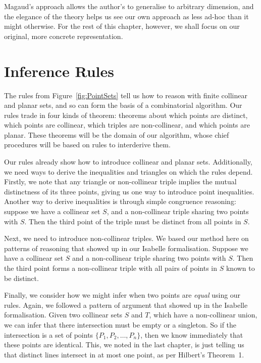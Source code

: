 Magaud's approach allows the author's to generalise to arbitrary dimension, and the elegance of the theory helps us see our own approach as less ad-hoc than it might otherwise. For the rest of this chapter, however, we shall focus on our original, more concrete representation.

\section{Inference Rules}
The rules from Figure~\ref{fig:PointSets} tell us how to reason with finite collinear and planar sets, and so can form the basis of a combinatorial algorithm. Our rules trade in four kinds of theorem: theorems about which points are distinct, which points are collinear, which triples are non-collinear, and which points are planar. These theorems will be the domain of our algorithm, whose chief procedures will be based on rules to interderive them.

Our rules already show how to introduce collinear and planar sets. Additionally, we need ways to derive the inequalities and triangles on which the rules depend. Firstly, we note that any triangle or non-collinear triple implies the mutual distinctness of its three points, giving us one way to introduce point inequalities. Another way to derive inequalities is through simple congruence reasoning: suppose we have a collinear set $S$, and a non-collinear triple sharing two points with $S$. Then the third point of the triple must be distinct from all points in $S$. 

Next, we need to introduce non-collinear triples. We based our method here on patterns of reasoning that showed up in our Isabelle formalisation. Suppose we have a collinear set $S$ and a non-collinear triple sharing two points with $S$. Then the third point forms a non-collinear triple with all pairs of points in $S$ known to be distinct.

Finally, we consider how we might infer when two points are \emph{equal} using our rules. Again, we followed a pattern of argument that showed up in the Isabelle formalisation. Given two collinear sets $S$ and $T$, which have a non-collinear union, we can infer that there intersection must be empty or a singleton. So if the intersection is a set of points $\{P_1,P_2,\ldots,P_n\}$, then we know immediately that these points are identical. This, we noted in the last chapter, is just telling us that distinct lines intersect in at most one point, as per Hilbert's Theorem~1.

